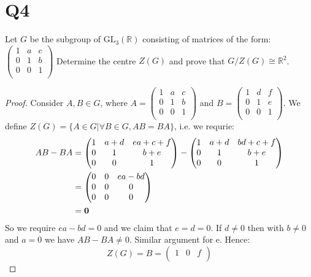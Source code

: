 \documentclass{article}
\begin{document}
\section*{Q4}
Let $G$ be the subgroup of $\text{GL}_3(\mathbb{R})$ consisting of matrices of the form:
$\begin{pmatrix}
1 & a & c\\
0 & 1 & b\\
0 & 0 & 1\\
\end{pmatrix}$
Determine the centre $Z(G)$ and prove that $G/Z(G)\cong\mathbb{R}^2$.
\begin{proof}
Consider $A,B\in G$, where $ A = \begin{pmatrix}
1 & a & c\\
0 & 1 & b\\
0 & 0 & 1\\
\end{pmatrix}$ and $ B = \begin{pmatrix}
1 & d & f\\
0 & 1 & e\\
0 & 0 & 1\\
\end{pmatrix}$. We define $Z(G)=\{A\in G|\forall B\in G, AB=BA\}$, i.e. we requrie:
\begin{align*}
AB-BA &= \begin{pmatrix}
1 & a+d & ea+c+f\\
0 & 1 & b+e\\
0 & 0 & 1\\
\end{pmatrix} - \begin{pmatrix}
1 & a+d & bd+c+f\\
0 & 1 & b+e\\
0 & 0 & 1\\
\end{pmatrix}\\
&=\begin{pmatrix}
0 & 0 & ea-bd\\
0 & 0 & 0\\
0 & 0 & 0\\
\end{pmatrix}\\
&=\bold{0}\\
\end{align*}
So we require $ea-bd=0$ and we claim that $e=d=0$. If $d\neq0$ then with $b\neq0$ and $a=0$ we have $AB-BA\neq0$. Similar argument for e. Hence:
$$Z(G)=B=\begin{pmatrix}
1 & 0 & f\\

\end{pmatrix}$$
\end{proof}
\end{document}
